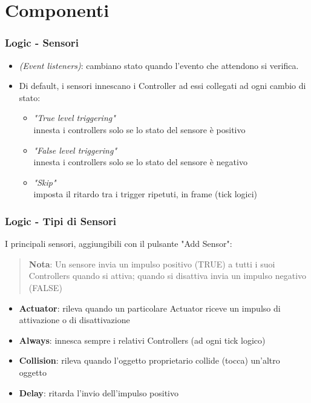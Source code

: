 \documentclass{beamer}
\begin{document}
	\section{Componenti}
		\begin{frame}		%
			\frametitle{Logic - Sensori}
			\begin{itemize}
				\item \textit{(Event listeners)}: \textcolor{BlenderOrange}{cambiano stato} quando l'evento che attendono si verifica.
				\item Di default, i sensori \textcolor{BlenderOrange}{innescano i Controller} ad essi collegati ad ogni cambio di stato:
				\begin{itemize}
					\item \textit{"True level triggering"} \\ {\footnotesize\hspace{1em} innesta i controllers solo se lo stato del sensore è positivo}
					\item \textit{"False level triggering"} \\ {\footnotesize\hspace{1em}innesta i controllers solo se lo stato del sensore è negativo}
					\item \textit{"Skip"} \\ {\footnotesize\hspace{1em}imposta il ritardo tra i trigger ripetuti, in frame (tick logici)}
				\end{itemize}
			\end{itemize}
		\end{frame}		
		\begin{frame}
			\frametitle{Logic - Tipi di Sensori}
			I principali sensori, aggiungibili con il pulsante "Add Sensor":\\
			\begin{quote}
			\textcolor{BlenderOrange}{\textbf{Nota}: Un sensore invia un impulso positivo (TRUE) a tutti i suoi Controllers quando si attiva; quando si disattiva invia un impulso negativo (FALSE)}
			\end{quote}
						
			\begin{itemize}
				\item \textbf{Actuator}: rileva quando un particolare Actuator riceve un impulso di attivazione o di disattivazione
				\item \textbf{Always}: innesca sempre i relativi Controllers (ad ogni tick logico)
				\item \textbf{Collision}: rileva quando l'oggetto proprietario collide (tocca) un'altro oggetto
				\item \textbf{Delay}: ritarda l'invio dell'impulso positivo
			\end{itemize}
		\end{frame}	
\end{document}
